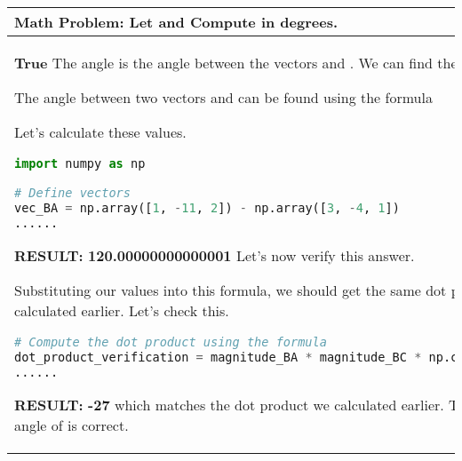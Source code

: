 \documentclass{article} \usepackage{iclr2023_conference,times}
\begin{document}
\begin{table*}[ht]
    \centering
    \begin{tabular}{p{}|p{}|p{}}
    \toprule
     \multicolumn{3}{p{0.90\textwidth}}{\small \textbf{Math Problem}:  Let   and   Compute  in degrees. } \\
     
    \midrule

    \small \textbf{True} 
\newline\newline
The angle  is the angle between the vectors  and . We can find these vectors as follows:





The angle  between two vectors  and  can be found using the formula


Let's calculate these values.
    \lstset{style=mystyle}
     \begin{lstlisting}[language=Python]
import numpy as np

# Define vectors
vec_BA = np.array([1, -11, 2]) - np.array([3, -4, 1])
......
     \end{lstlisting} 
    \textbf{RESULT:}\newline
    \textbf{120.00000000000001}\newline
    Let's now verify this answer.
    

Substituting our values into this formula, we should get the same dot product (-27) that we calculated earlier. Let's check this.
    \lstset{style=mystyle}
     \begin{lstlisting}[language=Python]
# Compute the dot product using the formula
dot_product_verification = magnitude_BA * magnitude_BC * np.cos(theta * np.pi / 180)
......
     \end{lstlisting} 
    \textbf{RESULT:}\newline
    \textbf{-27}\newline
    which matches the dot product we calculated earlier. Therefore, the computed angle of  is correct.

\small

     &
     \small \textbf{Uncertain} \newline
     \newline
the cosine of the angle  between them is given by


In the given problem, we want to find the angle between vectors  and , where




\end{tabular}
\end{table*}
\end{document}
